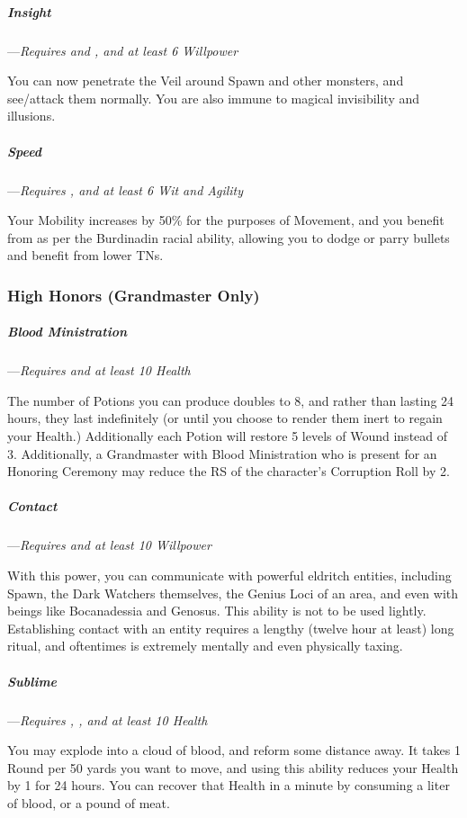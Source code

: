 \documentclass[oneside,11pt,english]{book}
\begin{document}
\subparagraph{Insight}\label{honor:Insight}
---\quad \emph{Requires  and , and at least 6 Willpower}

You can now penetrate the Veil around Spawn and other monsters, and see/attack
them normally. You are also immune to magical invisibility and illusions.

\subparagraph{Speed}\label{honor:Speed}
---\quad \emph{Requires , and at least 6 Wit and Agility}

Your Mobility increases by 50\% for the purposes of Movement, and you benefit
from  as per the Burdinadin racial ability, allowing
you to dodge or parry bullets and benefit from lower TNs.

\subsubsection{High Honors (Grandmaster Only)}
\subparagraph{Blood Ministration}\label{honor:Blood Ministration}
---\quad \emph{Requires  and at least 10 Health}

The number of Potions you can produce doubles to 8, and rather than lasting 24
hours, they last indefinitely (or until you choose to render them inert to
regain your Health.) Additionally each Potion will restore 5 levels of Wound
instead of 3. Additionally, a Grandmaster with Blood Ministration who is present
for an Honoring Ceremony may reduce the RS of the character’s Corruption Roll by
2.

\subparagraph{Contact}\label{honor:Contact}
---\quad \emph{Requires  and at least 10 Willpower}

With this power, you can communicate with powerful eldritch entities, including
Spawn, the Dark Watchers themselves, the Genius Loci of an area, and even with
beings like Bocanadessia and Genosus. This ability is not to be used lightly.
Establishing contact with an entity requires a lengthy (twelve hour at least)
long ritual, and oftentimes is extremely mentally and even physically taxing.

\subparagraph{Sublime}\label{honor:Sublime}
---\quad \emph{Requires , , and at least 10 Health}

You may explode into a cloud of blood, and reform some distance away. It takes 1
Round per 50 yards you want to move, and using this ability reduces your Health
by 1 for 24 hours. You can recover that Health in a minute by consuming a liter
of blood, or a pound of meat.
\end{document}
